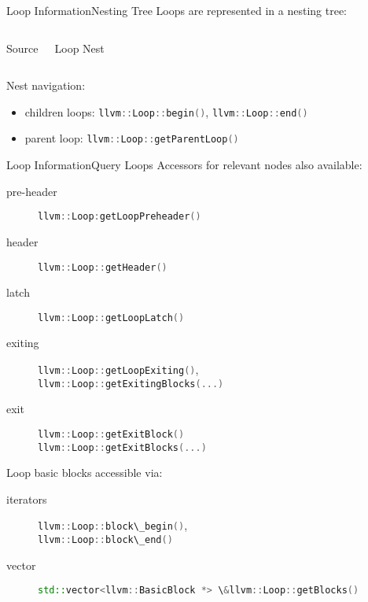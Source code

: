 \documentclass[10pt,mathserif]{beamer}
\newcommand{\cinput}[1]{}
\newcommand{\cppinline}[1]{\lstinline[language=C++]!#1!}
\begin{document}
\begin{frame}{Loop Information}{Nesting Tree}
Loops are represented in a \alert{nesting tree}:

\begin{columns}[t]
\begin{block}{Source}
\centering
\cinput{snippet/02/loop-nest.c}
\end{block}

\begin{block}{Loop Nest}
\centering

\end{block}
\end{columns}

Nest navigation:

\begin{itemize}
\item children loops: \cppinline{llvm::Loop::begin()},
      \cppinline{llvm::Loop::end()}
\item parent loop: \cppinline{llvm::Loop::getParentLoop()}
\end{itemize}
\end{frame}

\begin{frame}{Loop Information}{Query Loops}
Accessors for relevant nodes also available:

\begin{description}
\item[pre-header] \cppinline{llvm::Loop:getLoopPreheader()}
\item[header] \cppinline{llvm::Loop::getHeader()}
\item[latch] \cppinline{llvm::Loop::getLoopLatch()}
\item[exiting] \cppinline{llvm::Loop::getLoopExiting()}, \\
               \cppinline{llvm::Loop::getExitingBlocks(...)}
\item[exit] \cppinline{llvm::Loop::getExitBlock()} \\
            \cppinline{llvm::Loop::getExitBlocks(...)}
\end{description}

Loop basic blocks accessible via:

\begin{description}
\item[iterators] \cppinline{llvm::Loop::block\_begin()}, \\
                 \cppinline{llvm::Loop::block\_end()}
\item[vector]
      \cppinline{std::vector<llvm::BasicBlock *> \&llvm::Loop::getBlocks()}
\end{description}
\end{frame}
\end{document}
